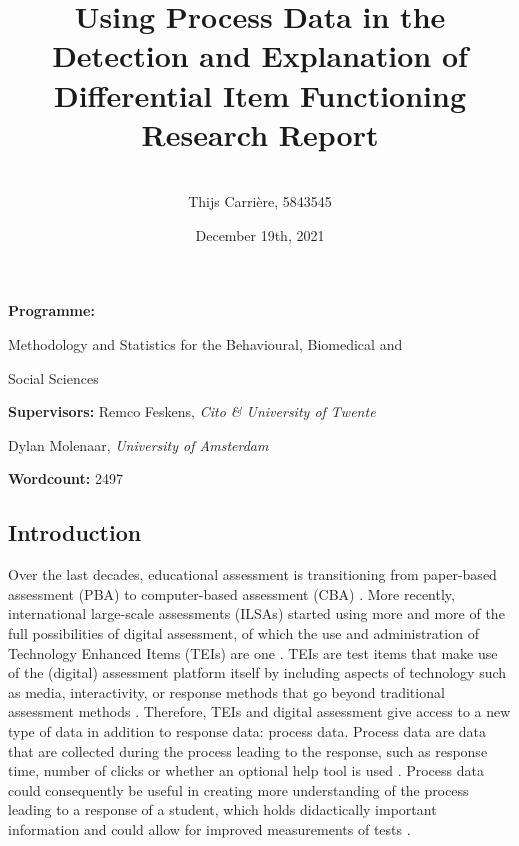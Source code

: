 \documentclass{article}
\title{Using Process Data in the Detection and Explanation of Differential Item Functioning\\
\vspace{5mm}
\Large{Research Report}}
\author{\vspace{5mm}\\
Thijs Carrière, 5843545}
\date{December 19th, 2021}
\begin{document}
\maketitle

\vspace{2in}

\begin{center}
    
{\large \textbf{Programme:} \vspace{1mm} {{Methodology and Statistics for the Behavioural, Biomedical and 

Social Sciences}}

\vspace{3mm}

\textbf{Supervisors:} Remco Feskens, \textit{Cito \& University of Twente}

\hspace{.83in} Dylan Molenaar, \textit{University of Amsterdam}

\vspace{3mm}
\textbf{Wordcount:} 2497
}

\end{center}

\newpage
\begin{center}
\section*{Introduction}
\end{center}
Over the last decades, educational assessment is transitioning from paper-based assessment (PBA) to computer-based assessment (CBA) \parencite{burkhardt2003computer}. More recently, international large-scale assessments (ILSAs) started using more and more of the full possibilities of digital assessment, of which the use and administration of Technology Enhanced Items (TEIs) are one \parencite{Commissionguide}. TEIs are test items that make use of the (digital) assessment platform itself by including aspects of technology such as media, interactivity, or response methods that go beyond traditional assessment methods \parencite{Commissionguide, bryant2017developing}. Therefore, TEIs and digital assessment give access to a new type of data in addition to response data: process data. Process data are data that are collected during the process leading to the response, such as response time, number of clicks or whether an optional help tool is used \parencite{molenaar2015value, wools2019validity}. Process data could consequently be useful in creating more understanding of the process leading to a response of a student, which holds didactically important information \parencite{wools2019validity} and could allow for improved measurements of tests \parencite{molenaar2015value}.
\end{document}
